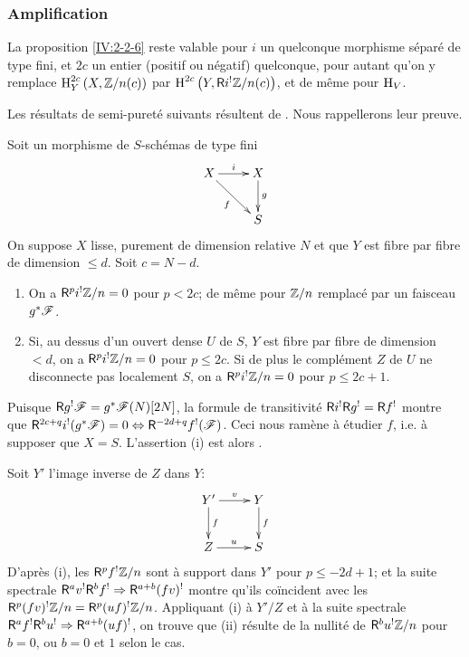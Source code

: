 \subsubsection{Amplification}\label{IV:2-2-7}

La proposition \ref{IV:2-2-6} reste valable pour $i$ un quelconque morphisme 
séparé de type fini, et $2 c$ un entier (positif ou négatif) quelconque, 
pour autant qu'on y remplace $\operatorname{H}_Y^{2 c}\left(X,\mathbb{Z}/n(c)\right)$ par 
$\operatorname{H}^{2 c}\left(Y,\mathsf{R} i^!\mathbb{Z}/n(c)\right)$, et de même pour $\operatorname{H}_V$. 

Les résultats de semi-pureté suivants résultent de 
\cite[1.8, 1.10, 1.15]{sga2}. Nous rappellerons leur preuve. 





\begin{theorem}\label{IV:2-2-8}
Soit un morphisme de $S$-schémas de type fini 
\[\xymatrix{
  X \ar[r]^-i \ar[dr]_-f 
    & X \ar[d]^-g \\
  & S
}\]
On suppose $X$ lisse, purement de dimension relative $N$ et que $Y$ est fibre 
par fibre de dimension $\leqslant d$. Soit $c=N-d$. 
\begin{enumerate}[\indent (i)]
  \item On a $\mathsf{R}^p i^!\mathbb{Z}/n=0$ pour $p<2 c$; de même pour $\mathbb{Z}/n$ remplacé 
    par un faisceau $g^* \mathscr{F}$.
  \item Si, au dessus d'un ouvert dense $U$ de $S$, $Y$ est fibre par fibre de 
    dimension $<d$, on a $\mathsf{R}^p i^!\mathbb{Z}/n=0$ pour $p\leqslant 2 c$. Si de plus le 
    complément $Z$ de $U$ ne disconnecte pas localement $S$, on a 
    $\mathsf{R}^pi^!\mathbb{Z}/n=0$ pour $p\leqslant 2 c+1$.
\end{enumerate}
\end{theorem}

Puisque $\mathsf{R} g^! \mathscr{F}=g^*\mathscr{F}(N)[2N]$, la formule de transitivité 
$\mathsf{R} i^!\mathsf{R} g^!=\mathsf{R} f^!$ montre que 
$\mathsf{R}^{2 c+q} i^!(g^*\mathscr{F})=0\Leftrightarrow \mathsf{R}^{-2 d+q}f^!(\mathscr{F})$. Ceci nous 
ramène à étudier $f$, i.e. à supposer que $X=S$. L'assertion (i) est 
alors \cite[XVIII 3.17]{sga4}. 

Soit $Y'$ l'image inverse de $Z$ dans $Y$:
\[\xymatrix{
  Y' \ar[r]^-v \ar[d]^-f 
    & Y \ar[d]^-f \\
  Z \ar[r]^-u 
    & S
}\]
D'après (i), les $\mathsf{R}^p f^! \mathbb{Z}/n$ sont à support dans $Y'$ pour 
$p\leqslant -2 d+1$; et la suite spectrale 
$\mathsf{R}^a v^!\mathsf{R}^b f^! \Rightarrow \mathsf{R}^{a+b} (f v)^!$ montre qu'ils coïncident avec 
les $\mathsf{R}^p(f v)^!\mathbb{Z}/n=\mathsf{R}^p(u f)^!\mathbb{Z}/n$. Appliquant (i) à $Y'/Z$ et à la 
suite spectrale $\mathsf{R}^a f^!\mathsf{R}^b u^! \Rightarrow \mathsf{R}^{a+b} (u f)^!$, on trouve que 
(ii) résulte de la nullité de $\mathsf{R}^b u^! \mathbb{Z}/n$ pour $b=0$, ou $b=0$ et $1$ 
selon le cas. 





